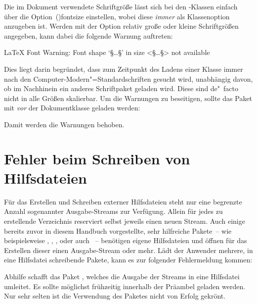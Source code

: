 %
Die im Dokument verwendete Schriftgröße lässt sich bei den \KOMAScript-Klassen 
einfach über die Option~\Option(){fontsize} einstellen, 
wobei diese \emph{immer} als Klassenoption anzugeben ist. Werden mit der Option 
relativ große oder kleine Schriftgrößen angegeben, kann dabei die folgende 
Warnung auftreten:
%
\begin{quoting}[rightmargin=0pt]
\begin{Code}
LaTeX Font Warning: Font shape `§\dots§' in size <§\dots§> not available
\end{Code}
\end{quoting}
%
Dies liegt darin begründet, dass zum Zeitpunkt des Ladens einer Klasse immer 
nach den Computer-Modern"=Standardschriften gesucht wird, unabhängig davon, ob 
im Nachhinein ein anderes Schriftpaket geladen wird. Diese sind de"~facto nicht 
in alle Größen skalierbar. Um die Warnungen zu beseitigen, sollte das Paket 
 mit  \emph{vor} der Dokumentklasse 
geladen werden:
%
\begin{quoting}[rightmargin=0pt]
\end{quoting}
%
Damit werden die Warnungen behoben.



\section{%
  Fehler beim Schreiben von Hilfsdateien%
  \label{sec:tips:write}%
}

%
Für das Erstellen und Schreiben externer Hilfsdateien steht  nur 
eine begrenzte Anzahl sogenannter Ausgabe-Streams zur Verfügung. Allein für 
jedes zu erstellende Verzeichnis reserviert  selbst jeweils einen 
neuen Stream. Auch einige bereits zuvor in diesem Handbuch vorgestellte, sehr 
hilfreiche Pakete~-- wie beispielsweise , , 
,  oder auch ~-- 
benötigen eigene Hilfsdateien und öffnen für das Erstellen dieser einen 
Ausgabe-Stream oder mehr. Lädt der Anwender mehrere, in eine Hilfsdatei 
schreibende Pakete, kann es zur folgender Fehlermeldung kommen:
%
\begin{quoting}
\end{quoting}
%
Abhilfe schafft das Paket , welches die Ausgabe der Streams 
in eine Hilfsdatei umleitet. Es sollte möglichst frühzeitig innerhalb der 
Präambel geladen werden. Nur sehr selten ist die Verwendung des Paketes nicht 
von Erfolg gekrönt. 

